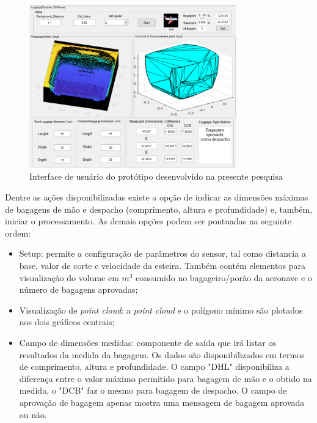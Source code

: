 \begin{apendicesenv}
        \begin{figure}[h!]
           \centering
           \includegraphics[width=0.8\textwidth]{imagens/softwareUI.png} 
           \caption{Interface de usuário do protótipo desenvolvido na presente pesquisa}
           \label{fig:softwareUI}
        \end{figure}

    Dentre as ações disponibilizadas existe a opção de indicar as dimensões máximas de bagagens de mão e despacho (comprimento, altura e profundidade) e, também, iniciar o processamento. As demais opções podem ser pontuadas na seguinte ordem:

\begin{itemize}
        \item Setup: permite a configuração de parâmetros do sensor, tal como distancia a base, valor de corte e velocidade da esteira. Também contém elementos para visualização do volume em $m^3$ consumido no bagageiro/porão da aeronave e o número de bagagens aprovadas;
        \item Visualização de \textit{point cloud}: a \textit{point cloud} e o polígono mínimo são plotados nos dois gráficos centrais;
        \item Campo de dimensões medidas: componente de saída que irá listar os resultados da medida da bagagem. Os dados são disponibilizados em termos de comprimento, altura e profundidade. O campo "DHL" disponibiliza a diferença entre o valor máximo permitido para bagagem de mão e o obtido na medida, o "DCB" faz o mesmo para bagagem de despacho. O campo de aprovação de bagagem apenas mostra uma mensagem de bagagem aprovada ou não.
\end{itemize}








\end{apendicesenv}